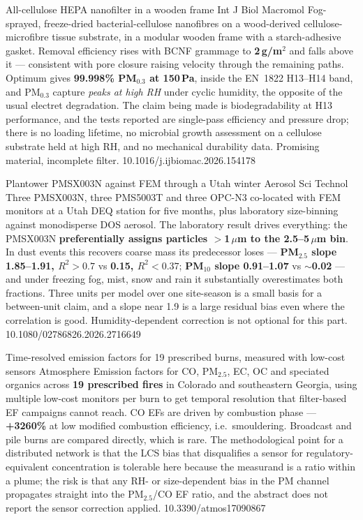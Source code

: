 \documentclass[10pt]{article}
\begin{document}
{All-cellulose HEPA nanofilter in a wooden frame}
{Int J Biol Macromol}
{Fog-sprayed, freeze-dried bacterial-cellulose nanofibres on a wood-derived
cellulose-microfibre tissue substrate, in a modular wooden frame with a starch-adhesive
gasket. Removal efficiency rises with BCNF grammage to \textbf{2\,g/m$^2$} and falls above
it --- consistent with pore closure raising velocity through the remaining paths. Optimum
gives \textbf{99.998\% PM$_{0.3}$ at 150\,Pa}, inside the EN~1822 H13--H14 band, and
PM$_{0.3}$ capture \emph{peaks at high RH} under cyclic humidity, the opposite of the
usual electret degradation. The claim being made is biodegradability at H13 performance,
and the tests reported are single-pass efficiency and pressure drop; there is no loading
lifetime, no microbial growth assessment on a cellulose substrate held at high RH, and no
mechanical durability data. Promising material, incomplete filter.}
{10.1016/j.ijbiomac.2026.154178}


{Plantower PMSX003N against FEM through a Utah winter}
{Aerosol Sci Technol}
{Three PMSX003N, three PMS5003T and three OPC-N3 co-located with FEM monitors at a Utah
DEQ station for five months, plus laboratory size-binning against monodisperse DOS
aerosol. The laboratory result drives everything: the PMSX003N
\textbf{preferentially assigns particles $>$1\,$\mu$m to the 2.5--5\,$\mu$m bin}. In dust
events this recovers coarse mass its predecessor loses --- \textbf{PM$_{2.5}$ slope
1.85--1.91, $R^2>0.7$} vs \textbf{0.15, $R^2<0.37$}; \textbf{PM$_{10}$ slope 0.91--1.07}
vs \textbf{$\sim$0.02} --- and under freezing fog, mist, snow and rain it substantially
overestimates both fractions. Three units per model over one site-season is a small basis
for a between-unit claim, and a slope near 1.9 is a large residual bias even where the
correlation is good. Humidity-dependent correction is not optional for this part.}
{10.1080/02786826.2026.2716649}

{Time-resolved emission factors for 19 prescribed burns, measured with low-cost sensors}
{Atmosphere}
{Emission factors for CO, PM$_{2.5}$, EC, OC and speciated organics across \textbf{19
prescribed fires} in Colorado and southeastern Georgia, using multiple low-cost monitors
per burn to get temporal resolution that filter-based EF campaigns cannot reach. CO EFs
are driven by combustion phase --- \textbf{+3260\%} at low modified combustion efficiency,
i.e.\ smouldering. Broadcast and pile burns are compared directly, which is rare. The
methodological point for a distributed network is that the LCS bias that disqualifies a
sensor for regulatory-equivalent concentration is tolerable here because the measurand is a
ratio within a plume; the risk is that any RH- or size-dependent bias in the PM channel
propagates straight into the PM$_{2.5}$/CO EF ratio, and the abstract does not report the
sensor correction applied.}
{10.3390/atmos17090867}
\end{document}
